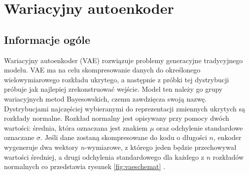 \documentclass[a4paper,12pt,oneside]{book} %
\begin{document}
\chapter{Wariacyjny autoenkoder}
\section{Informacje ogóle}
Wariacyjny autoenkoder (VAE) rozwiązuje problemy generacyjne tradycyjnego modelu. VAE ma na celu skompresowanie danych do określonego wielowymiarowego rozkładu ukrytego, a następnie z próbki tej dystrybucji próbuje jak najlepiej zrekonstruować wejście. Model ten należy go grupy wariacyjnych metod Bayesowskich, czemu zawdzięcza swoją nazwę. Dystrybucjami najczęściej wybieranymi do reprezentacji zmiennych ukrytych są rozkłady normalne. Rozkład normalny jest opisywany przy pomocy dwóch wartości: średnia, która oznaczana jest znakiem $\mu$ oraz odchylenie standardowe oznaczane $\sigma$. Jeśli dane zostaną skompresowane do kodu o długości $n$, enkoder wygeneruje dwa wektory $n$-wymiarowe, z którego jeden będzie przechowywał wartości średniej, a drugi odchylenia standardowego dla każdego z $n$ rozkładów normalnych co przedstawia rysunek \ref{fig:vaeschemat} \cite{vaetootorial}.
\end{document}
